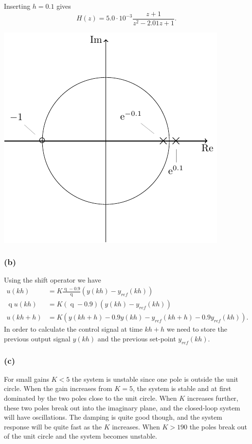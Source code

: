 \documentclass[letterpaper,12pt]{article}
\DeclareMathOperator{\shift}{q}
\begin{document}
Inserting \(h = 0.1\) gives
\[ H(z) = 5.0\cdot 10^{-3} \frac{z+1}{z^2 - 2.01z +1}.\]
\begin{center}
\includegraphics[]{imaginary-plane-pzmap}
\end{center}

\subsubsection*{(b)}
Using the shift operator we have
\begin{equation}
\begin{split}
  u(kh) &= K \frac{\shift - 0.9}{\shift} (y(kh) - y_{ref}(kh))\\
  \shift u(kh) &= K (\shift - 0.9) (y(kh) - y_{ref}(kh)) \\
  u(kh+h) &= K \left( y(kh+h) - 0.9y(kh) - y_{ref}(kh+h) - 0.9y_{ref}(kh)\right).
   \end{split}
 \end{equation}
In order to calculate the control signal at time $kh+h$ we need to store the previous output signal $y(kh)$ and the previous set-point $y_{ref}(kh)$. 
 
\subsubsection*{(c)}
For small gains $K<5$ the system is unstable since one pole is outside the unit circle. When the gain increases from $K=5$, the system is stable and at first dominated by the two poles close to the unit circle. When $K$ increases further, these two poles break out into the imaginary plane, and the closed-loop system will have oscillations. The damping is quite good though, and the system response will be quite fast as the $K$ increases. When $K>190$ the poles break out of the unit circle and the system becomes unstable. 
\end{document}
